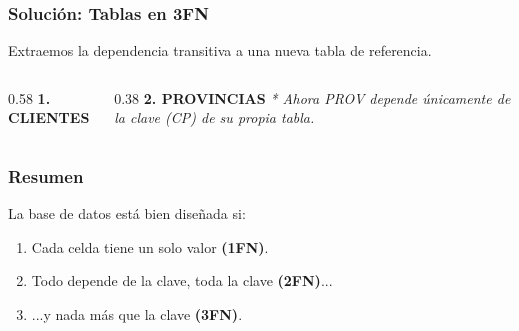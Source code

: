 \documentclass{beamer}
\begin{document}
\begin{frame}
  \frametitle{Solución: Tablas en 3FN}
  Extraemos la dependencia transitiva a una nueva tabla de referencia.

  \begin{columns}[t]
    \begin{column}{0.58\textwidth}
      \textbf{1. CLIENTES}
    \end{column}

    \begin{column}{0.38\textwidth}
      \textbf{2. PROVINCIAS}
      \vspace{1em}
      \footnotesize{\textit{* Ahora PROV depende únicamente de la clave (CP) de su propia tabla.}}
    \end{column}
  \end{columns}
\end{frame}


\begin{frame}
  \frametitle{Resumen}
  \begin{center}
      La base de datos está bien diseñada si:
      \vspace{1em}
      
      \begin{enumerate}
          \item Cada celda tiene un solo valor \textbf{(1FN)}.
          \item Todo depende de la clave, toda la clave \textbf{(2FN)}...
          \item ...y nada más que la clave \textbf{(3FN)}.
      \end{enumerate}
  \end{center}
\end{frame}
\end{document}
